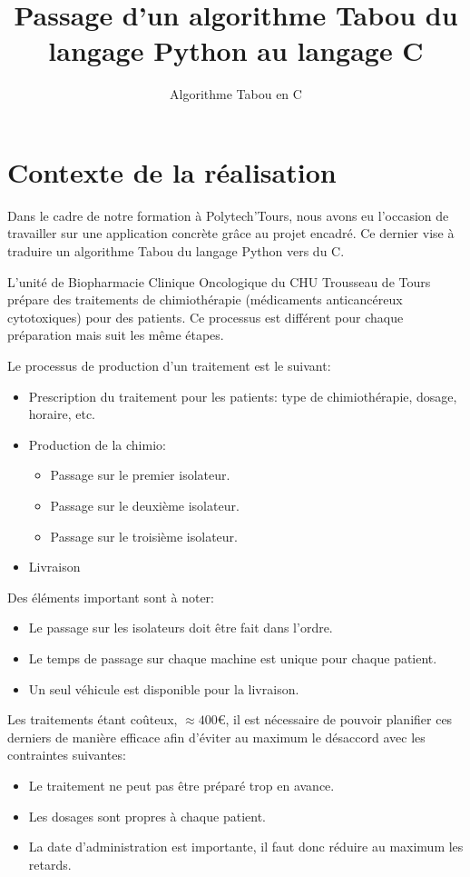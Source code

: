 \documentclass[hideweeklyreports]{polytech/polytech}
\title{Passage d'un algorithme Tabou du langage Python au langage C}
\subtitle{Algorithme Tabou en C}
\begin{document}
	\chapter{Contexte de la réalisation}
		Dans le cadre de notre formation à Polytech'Tours, nous avons eu l'occasion de travailler sur une application concrète grâce au projet encadré. Ce dernier vise à traduire un algorithme Tabou du langage Python vers du C.
		
		L'unité de Biopharmacie Clinique Oncologique du CHU Trousseau de Tours prépare des traitements de chimiothérapie (médicaments anticancéreux cytotoxiques) pour des patients. Ce processus est différent pour chaque préparation mais suit les même étapes.
		
		Le processus de production d'un traitement est le suivant:
		\begin{itemize}
			\item Prescription du traitement pour les patients: type de chimiothérapie, dosage, horaire, etc.
			\item Production de la chimio:
			\begin{itemize}
				\item Passage sur le premier isolateur.
				\item Passage sur le deuxième isolateur.
				\item Passage sur le troisième isolateur.
			\end{itemize}
			\item Livraison
		\end{itemize}
		
		Des éléments important sont à noter:
		\begin{itemize}
			\item Le passage sur les isolateurs doit être fait dans l'ordre.
			\item Le temps de passage sur chaque machine est unique pour chaque patient.
			\item Un seul véhicule est disponible pour la livraison.
		\end{itemize}
		
		Les traitements étant coûteux, $\approx 400$€, il est nécessaire de pouvoir planifier ces derniers de manière efficace afin d'éviter au maximum le désaccord avec les contraintes suivantes:
		\begin{itemize}
			\item Le traitement ne peut pas être préparé trop en avance.
			\item Les dosages sont propres à chaque patient.
			\item La date d'administration est importante, il faut donc réduire au maximum les retards.
		\end{itemize}
		
\end{document}
